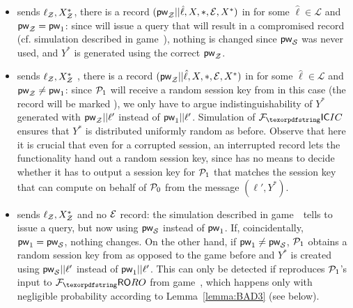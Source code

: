 \begin{games}
\begin{itemize}
 \item \Env sends $\ell_\mathcal{Z},X^*_\mathcal{Z}$, there is a record $(\mathsf{pw}_\mathcal{Z}||\hat\ell,X,*,\mathcal{E},X^*)$ in \ListIC for some $\hat\ell\in\mathcal{L}$ and $\mathsf{pw}_\mathcal{Z}=\mathsf{pw}_{1}$: since \Sim will issue a \TestPwd query that will result in a compromised record (cf. simulation described in game~), nothing is changed since $\mathsf{pw}_\mathcal{S}$ was never used, and $Y^*$ is generated using the correct \password $\mathsf{pw}_\mathcal{Z}$.
 \item \Env sends $\ell_\mathcal{Z},X^*_\mathcal{Z}$ , there is a record $(\mathsf{pw}_\mathcal{Z}||\hat\ell,X,*,\mathcal{E},X^*)$ in \ListIC for some $\hat\ell\in\mathcal{L}$ and $\mathsf{pw}_\mathcal{Z}\neq\mathsf{pw}_{1}$: since $\mathcal{P}_{1}$ will receive a random session key from \Func in this case (the record will be marked ), we only have to argue indistinguishability of $Y^*$ generated with $\mathsf{pw}_\mathcal{Z}||\ell'$ instead of $\mathsf{pw}_{1}||\ell'$. Simulation of $\Fic$ ensures that $Y^*$ is distributed uniformly random as before. Observe that here it is crucial that even for a corrupted session, an interrupted record lets the functionality hand out a random session key, since \Sim has no means to decide whether it has to output a session key for $\mathcal{P}_{1}$ that matches the session key that \Env can compute on behalf of $\mathcal{P}_{0}$ from the message $(\ell',Y^*)$.
 \item \Env sends $\ell_\mathcal{Z},X^*_\mathcal{Z}$ and no $\mathcal{E}$ record: the simulation described in game~~tells \Sim to issue a \TestPwd query, but now using $\mathsf{pw}_\mathcal{S}$ instead of $\mathsf{pw}_{1}$. If, coincidentally, $\mathsf{pw}_{1}=\mathsf{pw}_\mathcal{S}$, nothing changes. On the other hand, if $\mathsf{pw}_{1}\neq\mathsf{pw}_\mathcal{S}$, $\mathcal{P}_{1}$ obtains a random session key from \Func as opposed to the game before and $Y^*$ is created using $\mathsf{pw}_\mathcal{S}||\ell'$ instead of $\mathsf{pw}_{1}||\ell'$. This can only be detected if \Env reproduces $\mathcal{P}_{1}$'s input to $\Fro$ from game~\previousgame, which happens only with negligible probability according to Lemma~\ref{lemma:BAD3} (see below). 

\end{itemize}
\end{games}
